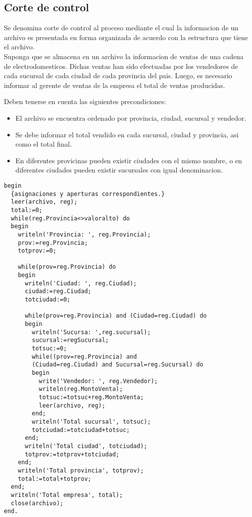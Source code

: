 \subsection{Corte de control}

Se denomina corte de control al proceso mediante el cual la informacion de un archivo es presentada en forma organizada de acuerdo con la estructura que tiene el archivo. \\
Suponga que se almacena en un archivo la informacion de ventas de una cadena de electrodomesticos. Dichas ventas han sido efectuadas por los vendedores de cada sucursal de cada ciudad de cada provincia del pais. Luego, es necesario informar al gerente de ventas de la empresa el total de ventas producidas.

Deben tenerse en cuenta las siguientes precondiciones:
\begin{itemize}
    \item El archivo se encuentra ordenado por provincia, ciudad, sucursal y vendedor.
    \item Se debe informar el total vendido en cada sucursal, ciudad y provincia, asi como el total final.
    \item En diferentes provicinas pueden existir ciudades con el mismo nombre, o en diferentes ciudades pueden existir sucursales con igual denominacion.
\end{itemize}

\begin{lstlisting}
begin
  {asignaciones y aperturas correspondientes.}
  leer(archivo, reg);
  total:=0;
  while(reg.Provincia<>valoralto) do
  begin
    writeln('Provincia: ', reg.Provincia);
    prov:=reg.Provincia;
    totprov:=0;

    while(prov=reg.Provincia) do
    begin
      writeln('Ciudad: ', reg.Ciudad);
      ciudad:=reg.Ciudad;
      totciudad:=0;

      while(prov=reg.Provincia) and (Ciudad=reg.Ciudad) do
      begin
        writeln('Sucursa: ',reg.sucursal);
        sucursal:=regSucursal;
        totsuc:=0;
        while((prov=reg.Provincia) and
        (Ciudad=reg.Ciudad) and Sucursal=reg.Sucursal) do
        begin
          write('Vendedor: ', reg.Vendedor);
          writeln(reg.MontoVenta);
          totsuc:=totsuc+reg.MontoVenta;
          leer(archivo, reg);
        end;
        writeln('Total sucursal', totsuc);
        totciudad:=totciudad+totsuc;
      end;
      writeln('Total ciudad', totciudad);
      totprov:=totprov+totciudad;
    end;
    writeln('Total provincia', totprov);
    total:=total+totprov;
  end;
  writeln('Total empresa', total);
  close(archivo);
end.
\end{lstlisting}

